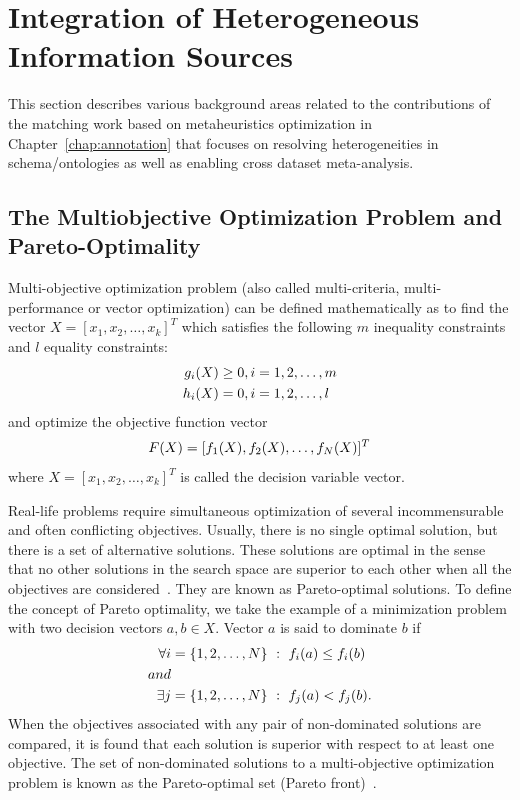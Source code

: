 \section{Integration of Heterogeneous Information Sources}
This section describes various background areas related to the contributions of the matching work based on metaheuristics optimization in Chapter~\ref{chap:annotation} that focuses on resolving heterogeneities in schema/ontologies as well as enabling cross dataset meta-analysis.
\label{sec:annotAndMatching}
\subsection{The Multiobjective Optimization Problem and Pareto-Optimality}
Multi-objective optimization problem (also called multi-criteria, multi-performance or vector optimization) can be defined mathematically as to find the vector $X=[x_1, x_2, \ldots, x_k]^T$ which satisfies the following $m$ inequality constraints and $l$ equality constraints:
\begin{align}
\notag g_i(X)&\geq0, i=1,2,\ldots,m\\
\notag h_i(X)&=0, i=1,2,\ldots,l
\end{align}
and optimize the objective function vector
\begin{align}
\notag F(X)=[f_1(X), f_2(X), \ldots, f_N(X)]^T
\end{align}
where $X=[x_1, x_2, \ldots, x_k]^T$ is called the decision variable vector.

Real-life problems require simultaneous optimization of several incommensurable and often conflicting objectives. Usually, there is no single optimal solution, but there is a set of alternative solutions. These solutions are optimal in the sense that no other solutions in the search space are superior to each other when all the objectives are considered~\cite{SumanSurvey}. They are known as Pareto-optimal solutions. To define the concept of Pareto optimality, we take the example of a minimization problem with two decision vectors $a, b\in X$. Vector $a$ is said to dominate $b$ if
\begin{align}
\notag \forall i &= \{1,2,\ldots,N\}~:~f_i(a)\leq f_i(b)\\
\notag and\\
\notag \exists j &= \{1,2,\ldots,N\}~:~f_j(a)<f_j(b).
\end{align}
When the objectives associated with any pair of non-dominated solutions are compared, it is found that each solution is superior with respect to at least one objective. The set of non-dominated solutions to a multi-objective optimization problem is known as the Pareto-optimal set (Pareto front)~\cite{Zitzler98multiobjectiveoptimization}.

